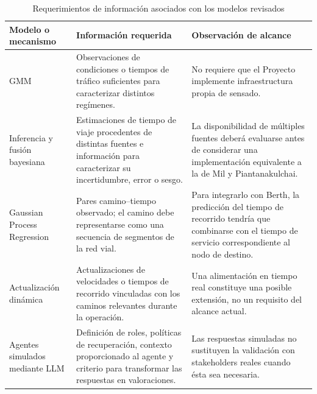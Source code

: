 \documentclass[11pt]{article}
\begin{document}
\begin{table}[ht]
\centering
\small
\caption{Requerimientos de información asociados con los modelos revisados}
\label{tab:requerimientos_modelos}

\renewcommand{\arraystretch}{1.15}

\begin{tabularx}{\textwidth}{
@{}
>{\raggedright\arraybackslash}p{}
>{\raggedright\arraybackslash}p{}
>{\raggedright\arraybackslash}X
@{}}
\toprule
\textbf{Modelo o mecanismo} &
\textbf{Información requerida} &
\textbf{Observación de alcance} \\
\midrule

GMM &
Observaciones de condiciones o tiempos de tráfico suficientes para caracterizar
distintos regímenes. &
No requiere que el Proyecto implemente infraestructura propia de sensado. \\[0.25em]

Inferencia y fusión bayesiana &
Estimaciones de tiempo de viaje procedentes de distintas fuentes e información
para caracterizar su incertidumbre, error o sesgo. &
La disponibilidad de múltiples fuentes deberá evaluarse antes de considerar una
implementación equivalente a la de Mil y Piantanakulchai. \\[0.25em]

Gaussian Process Regression &
Pares camino--tiempo observado; el camino debe representarse como una secuencia
de segmentos de la red vial. &
Para integrarlo con Berth, la predicción del tiempo de recorrido tendría que combinarse
con el tiempo de servicio correspondiente al nodo de destino. \\[0.25em]

Actualización dinámica &
Actualizaciones de velocidades o tiempos de recorrido vinculadas con los caminos
relevantes durante la operación. &
Una alimentación en tiempo real constituye una posible extensión, no un requisito
del alcance actual. \\[0.25em]

Agentes simulados mediante LLM &
Definición de roles, políticas de recuperación, contexto proporcionado al agente y
criterio para transformar las respuestas en valoraciones. &
Las respuestas simuladas no sustituyen la validación con stakeholders reales cuando
ésta sea necesaria. \\

\bottomrule
\end{tabularx}
\end{table}
\end{document}
